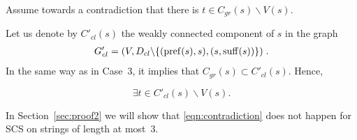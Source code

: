 Assume towards a contradiction that there is $ t \in C_{gr} (s) \backslash V (s) $.

Let us denote by $ C'_{cl} (s) $ the weakly connected component of $s$ in the graph 
\begin{align*}
G'_{cl} = (V, D_{cl} \backslash \{(\operatorname{pref} (s), s), (s, \operatorname{suff} (s)) \}) \; .
\end{align*}
 In the same way as in Case~3, it implies that  $ C_{gr} (s) \subset C'_{cl} (s) $. Hence,

\begin{equation}
\label{eqn:contradiction}
    \exists t \in C'_{cl}(s) \backslash V(s).
\end{equation}

In Section~\ref{sec:proof2} we will show that \eqref{eqn:contradiction} does not happen for SCS on strings of length at most~$3$.